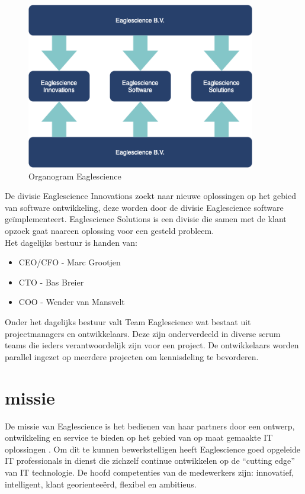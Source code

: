 \begin{figure}[bth]
\myfloatalign
\includegraphics[width=10cm]{gfx/organogram}
\caption{Organogram Eaglescience}
\label{fig:Eaglescience organogram}
\end{figure}
De divisie Eaglescience Innovations zoekt naar nieuwe oplossingen op het gebied van software ontwikkeling, deze worden door de divisie  Eaglescience software ge\"implementeert. Eaglescience Solutions is een divisie die samen met de klant opzoek gaat naareen oplossing voor een gesteld probleem.\\
Het dagelijks bestuur is handen van:
\begin{itemize}
\item CEO/CFO - Marc Grootjen
\item CTO - Bas Breier
\item COO - Wender van Mansvelt \\
\end{itemize}
Onder het dagelijks bestuur valt Team Eaglescience wat bestaat uit projectmanagers en ontwikkelaars. Deze zijn onderverdeeld in diverse scrum teams die ieders verantwoordelijk zijn voor een project. De ontwikkelaars worden parallel ingezet op meerdere projecten om kennisdeling te bevorderen.

\section{missie}
De missie van Eaglescience is het bedienen van haar partners door een ontwerp, ontwikkeling en service te bieden op het gebied van op maat gemaakte IT oplossingen . Om dit te kunnen bewerkstelligen heeft Eaglescience goed opgeleide IT professionals in dienst die zichzelf continue ontwikkelen op de “cutting edge” van IT technologie. De hoofd competenties van de medewerkers zijn: innovatief, intelligent, klant georientee\"erd, flexibel en ambitieus.

